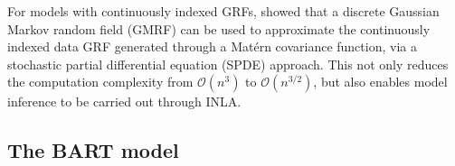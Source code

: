 \documentclass[preprint,12pt,authoryear]{elsarticle}
\begin{document}
For models with continuously indexed GRFs, \cite{lindgren2011explicit} showed that a discrete Gaussian Markov random field (GMRF) can be used to approximate the continuously indexed data GRF generated through a Mat\'ern covariance function, via a stochastic partial differential equation (SPDE) approach. This not only reduces the computation complexity from $\mathcal{O}(n^{3})$ to $\mathcal{O}(n^{3/2})$, but also enables model inference to be carried out through INLA. 


\subsection{The BART model}
\label{sec:BART}
%
\end{document}

